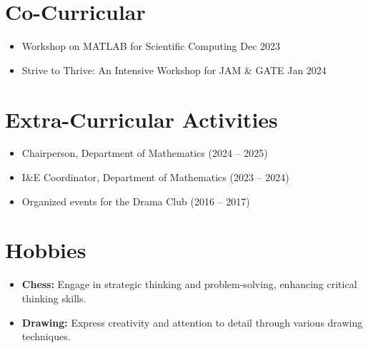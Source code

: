 \documentclass[a4paper,10pt]{article}
\begin{document}
\section*{Co-Curricular}
\begin{itemize}[leftmargin=1.5cm]
    \item Workshop on MATLAB for Scientific Computing \hfill Dec 2023
    \item Strive to Thrive: An Intensive Workshop for JAM \& GATE \hfill Jan 2024
\end{itemize}

\section*{Extra-Curricular Activities}
\begin{itemize}[leftmargin=1.5cm]
    \item Chairperson, Department of Mathematics (2024 -- 2025)
    \item I\&E Coordinator, Department of Mathematics (2023 -- 2024)
    \item Organized events for the Drama Club (2016 -- 2017)
\end{itemize}

\section*{Hobbies}
\begin{itemize}[leftmargin=1.5cm]
    \item \textbf{Chess:} Engage in strategic thinking and problem-solving, enhancing critical thinking skills.
    \item \textbf{Drawing:} Express creativity and attention to detail through various drawing techniques.
\end{itemize}
\end{document}
